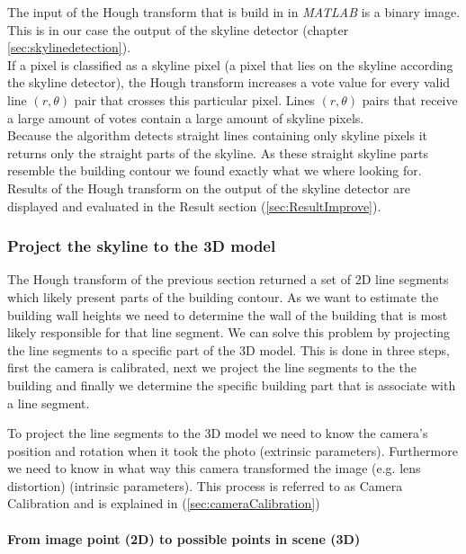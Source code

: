 	The input of the Hough transform that is build in in \emph{MATLAB} is a binary
	image. This is in our case the output of the skyline detector (chapter
	\ref{sec:skylinedetection}).\\
	If a pixel is classified as a skyline pixel (a pixel that lies on the
	skyline according the skyline detector), the Hough transform increases
	a vote value for every valid line $(r,\theta)$ pair that crosses this
	particular pixel.  
	Lines $(r,\theta)$ pairs that receive a large amount of votes
	contain a large amount of skyline pixels.\\
	Because the algorithm detects straight lines containing only skyline pixels
	it returns only the straight parts of the skyline.
	As these straight skyline parts resemble the building contour
	we found exactly what we where looking for.\\

	Results of the Hough transform on the output of the skyline detector are
	displayed and evaluated in the Result section (\ref{sec:ResultImprove}).

\subsubsection{Project the skyline to the 3D model}
\label{sec:project}

	The Hough transform of the previous section returned a set of 2D line
	segments which likely present parts of the building contour.  
	As we want to estimate the building wall heights we need to determine the wall
	of the building that is most likely responsible for that line segment.
	We can solve this problem by projecting the line segments to a specific
	part of the 3D model.  
	This is done in three steps, first the camera is calibrated, next we
	project the line segments to the the building and finally we 
	determine the specific building part that is associate with a line segment.

	To project the line segments to the 3D model we need to know the
	camera's position and rotation when it took the photo (extrinsic
	parameters). Furthermore we need to know in what way this camera transformed
	the image (e.g. lens distortion) (intrinsic parameters).
	This process is referred to as Camera Calibration and is explained in 
	(\ref{sec:cameraCalibration})
	 
	\paragraph{From image point (2D) to possible points in scene (3D)} 

